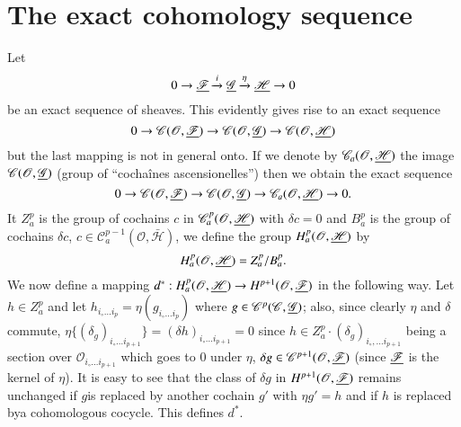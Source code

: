\section{The exact cohomology sequence}\label{chap13:sec3}
Let 
$$
0 \to \underline{\mathscr{F}} \xrightarrow{i} \underline{\mathscr{G}}
\xrightarrow{\eta} \underline{\mathscr{H}} \to 0
$$
be an exact sequence of sheaves. This evidently gives rise to an exact
sequence
$$
0 \to \mathscr{C} (\mathscr{O}, \underline{\mathscr{F}}) \to \mathscr{C}
(\mathscr{O}, \underline{\mathscr{G}}) \to \mathscr{C} (\mathscr{O},
\underline{\mathscr{H}}) 
$$
but the last mapping is not in general onto. If we denote by
$\mathscr{C}_a (\mathscr{O}, \underline{\mathscr{H}})$ the image $\mathscr{C}
(\mathscr{O}, \underline{\mathscr{G}})$ (group of ``cocha\^ines
ascensionelles'') then we obtain the exact sequence
$$
0 \to \mathscr{C} (\mathscr{O}, \underline{\mathscr{F}}) \to \mathscr{C}
(\mathscr{O}, \underline{\mathscr{G}}) \to \mathscr{C}_a (\mathscr{O},
\underline{\mathscr{H}}) \to 0.
$$
It $Z^p_a$ is the group of cochains $c$ in $\mathscr{C}^p_a
(\mathscr{O}, \underline{\mathscr{H}})$ with $\delta c = 0$ and $B^p_a$ is the
group of cochains $\delta c$, $c \in \mathscr{C}^{p-1}_a
(\mathscr{O}, \bar{\mathscr{H}})$, we define the group $H^p_a
(\mathscr{O}, \underline{\mathscr{H}})$ by
$$
H^p_a (\mathscr{O}, \underline{\mathscr{H}}) = Z^p_a / B^p_a. 
$$
We now define a mapping $d^\ast : H^p_a (\mathscr{O}, \underline{\mathscr{H}})
\to H^{p+1} (\mathscr{O}, \underline{\mathscr{F}})$ in the following way. Let
$h \in Z^p_a$ and let $h_{i_\circ \ldots i_p} =\eta (g_{i_\circ \ldots
i_p})$ where $g \in \mathscr{C}^p (\mathscr{C}, \underline{\mathscr{G}})$;
also, since clearly $\eta$ and $\delta$ commute,
$\eta\{(\delta_g)_{i_\circ \ldots i_{p+1}} \} = (\delta h)_{i_\circ
  \ldots i_{p+1}} = 0$ since $h \in Z^p_a \cdot (\delta_g)_{i_\circ,
  \ldots i_{p+1}}$ being a section over $\mathscr{O}_{i_\circ \ldots
  i_{p+1}}$ which goes to 0 under $\eta$, $\delta g \in
\mathscr{C}^{p+1} (\mathscr{O}, \underline{\mathscr{F}})$ (since
$\underline{\mathscr{F}}$ is the kernel of $\eta$). It is easy to see that the
class of $\delta g $ in $H^{p+1} (\mathscr{O}, \underline{\mathscr{F}})$
remains unchanged if $g$\pageoriginale is replaced by another cochain
$g'$ with $\eta g' =h$ and if $h$ is replaced bya cohomologous
cocycle. This defines $d^\ast$.

